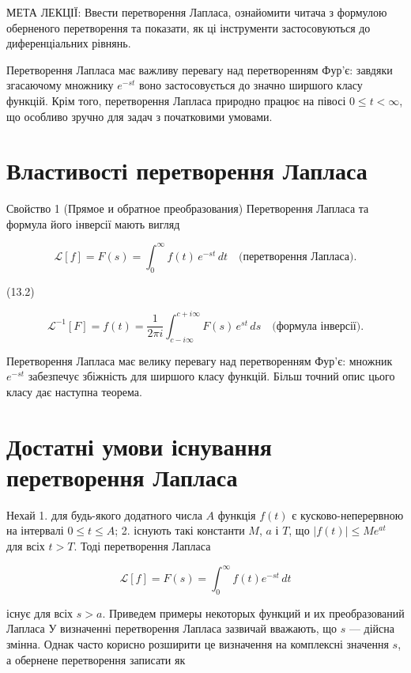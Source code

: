 \documentclass[
  ukrainian,
]{article}
\begin{document}
МЕТА ЛЕКЦІЇ: Ввести перетворення Лапласа, ознайомити читача з формулою
оберненого перетворення та показати, як ці інструменти застосовуються до
диференціальних рівнянь.

Перетворення Лапласа має важливу перевагу над перетворенням Фур'є:
завдяки згасаючому множнику \(e^{-st}\) воно застосовується до значно
ширшого класу функцій. Крім того, перетворення Лапласа природно працює
на півосі \(0 \le t < \infty\), що особливо зручно для задач з
початковими умовами.

\section{Властивості перетворення
Лапласа}\label{ux432ux43bux430ux441ux442ux438ux432ux43eux441ux442ux456-ux43fux435ux440ux435ux442ux432ux43eux440ux435ux43dux43dux44f-ux43bux430ux43fux43bux430ux441ux430}

Свойство 1 (Прямое и обратное преобразования) Перетворення Лапласа та
формула його інверсії мають вигляд

\[
\mathscr{L}[f] = F(s) = \int_{0}^{\infty} f(t) \, e^{-st} \, dt
\quad \text{(перетворення Лапласа).}
\]

(13.2)

\[
\mathscr{L}^{-1}[F] = f(t) = \frac{1}{2\pi i} \int_{c-i\infty}^{c+i\infty} F(s) \, e^{st} \, ds
\quad \text{(формула інверсії).}
\]

Перетворення Лапласа має велику перевагу над перетворенням Фур'є:
множник \(e^{-st}\) забезпечує збіжність для ширшого класу функцій.
Більш точний опис цього класу дає наступна теорема.

\section{Достатні умови існування перетворення
Лапласа}\label{ux434ux43eux441ux442ux430ux442ux43dux456-ux443ux43cux43eux432ux438-ux456ux441ux43dux443ux432ux430ux43dux43dux44f-ux43fux435ux440ux435ux442ux432ux43eux440ux435ux43dux43dux44f-ux43bux430ux43fux43bux430ux441ux430}

Нехай 1. для будь-якого додатного числа \(A\) функція \(f(t)\) є
кусково-неперервною на інтервалі \(0 \le t \le A\); 2. існують такі
константи \(M\), \(a\) і \(T\), що \(|f(t)| \le Me^{at}\) для всіх
\(t > T\). Тоді перетворення Лапласа

\[
\mathscr{L}[f] = F(s) = \int_0^\infty f(t)e^{-st}\,dt
\]

існує для всіх \(s > a\). Приведем примеры некоторых функций и их
преобразований Лапласа У визначенні перетворення Лапласа зазвичай
вважають, що \(s\) --- дійсна змінна. Однак часто корисно розширити це
визначення на комплексні значення \(s\), а обернене перетворення
записати як
\end{document}

